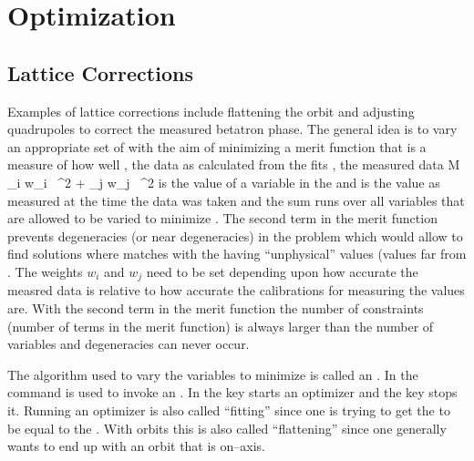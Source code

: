 \chapter{Optimization}
\label{c:opti}

\section{Lattice Corrections}

Examples of lattice corrections include flattening the orbit and
adjusting quadrupoles to correct the measured betatron phase. The
general idea is to vary an appropriate set of  with the
aim of minimizing a merit function  that is a measure of how
well , the data as calculated from the  fits
, the measured data
\Begineq
  {\cal M} \equiv \sum_{i} w_i \,
    ^2 + 
  \sum_{j} w_j \,
    ^2
  \label{m1}
\Endeq
{} is the value of a variable in the  and
 is the value as measured at the time the data was taken
and the sum  runs over all variables that are allowed to be
varied to minimize . The second term in the merit function
prevents degeneracies (or near degeneracies) in the problem which
would allow \tao to find solutions where  matches
 with the  having ``unphysical''
values (values far from . The weights $w_i$ and $w_j$
need to be set depending upon how accurate the measred data is
relative to how accurate the calibrations for measuring the
 values are. With the second term in the merit function
the number of constraints (number of terms in the merit function) is
always larger than the number of variables and degeneracies can never
occur. 

The algorithm used to vary the  variables to minimize
 is called an . In  the
 command is used to invoke an . In  the  key starts an optimizer and the  key stops it.
Running an optimizer is also called ``fitting'' since one is trying to
get the  to be equal to the . With orbits
this is also called ``flattening'' since one generally wants to end up
with an orbit that is on--axis.


